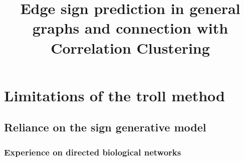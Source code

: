 \documentclass[nobib, a4paper, 10pt, oneside, onecolumn, openany, notitlepage, final,
svgnames, marginals=raggedouter, english,
]{article}
\title{Edge sign prediction in general graphs and connection with Correlation Clustering}
\begin{document}
\maketitle

% 

\section{Limitations of the troll method}
\label{sec:limitations_of_the_troll_method}

\subsection{Reliance on the sign generative model}
\label{sub:reliance_on_the_sign_generative_model}

\iffalse
The method presented in the previous chapter hinges crucially upon our sign generative model. Yet
one can imagine contexts where this model is not applicable, especially when nodes do not represent
human beings. One way to alleviate this issue was introduced with our online algorithm, where this
time, signs are generated by an arbitrary adversary. However, in that case, we are still facing two
limitations\marginpars{limitations is not the right word, maybe \emph{strong constraints}…}
\begin{enumerate}
	\item Our bias remains that the labeling is regular (recall this means informally that the all
		the outgoing signs from a given node tend to be the same, and likewise for the incoming signs),
		since irregularities are the cost payed by the adversary to make our algorithm mispredict. While
		this bias is well suited to social networks, other applications may require other
		bias\marginpars{namely the \pcc{} bias we'll introduce next}.
	\item In the online setting, we evaluate our performance by the regret\marginpars{ref to regret equation},
		whereas in general we are interested in more classical measures of predictive accuracy.
\end{enumerate}
\fi

\subsubsection{Experience on directed biological networks}
\label{ssub:experience_on_directed_biological_networks}
\end{document}
